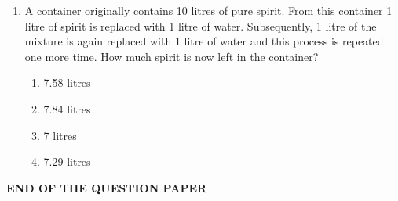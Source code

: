 \documentclass[journal,12pt,onecolumn]{IEEEtran}
\begin{document}
\begin{enumerate}
\item A container originally contains 10 litres of pure spirit. From this container 1 litre of spirit is replaced with 1 litre of water. Subsequently, 1 litre of the mixture is again replaced with 1 litre of water and this process is repeated one more time. How much spirit is now left in the container?

\hfill{}

\begin{multicols}{4}
\begin{enumerate}
    \item 7.58 litres
    \item 7.84 litres
    \item 7 litres
    \item 7.29 litres
\end{enumerate}
\end{multicols}



\end{enumerate}

\vspace{2em}

\begin{center}
    \textbf{END OF THE QUESTION PAPER}
\end{center}
\end{document}

